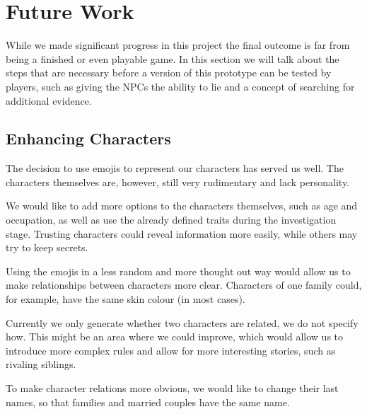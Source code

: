 \section{Future Work} \label{future_work}

While we made significant progress in this project the final outcome is far from being a finished or even playable game.
In this section we will talk about the steps that are necessary before a version of this prototype can be tested by players, such as giving the NPCs the ability to lie and a concept of searching for additional evidence.

\subsection{Enhancing Characters}

The decision to use emojis  to represent our characters has served us well.
The characters themselves are, however, still very rudimentary and lack personality.

We would like to add more options to the characters themselves, such as age and occupation, as well as use the already defined traits during the investigation stage.
Trusting characters could reveal information more easily, while others may try to keep secrets.

Using the emojis in a less random and more thought out way would allow us to make relationships between characters more clear.
Characters of one family could, for example, have the same skin colour (in most cases).

Currently we only generate whether two characters are related, we do not specify how.
This might be an area where we could improve, which would allow us to introduce more complex rules and allow for more interesting stories, such as rivaling siblings.

To make character relations more obvious, we would like to change their last names, so that families and married couples have the same name.